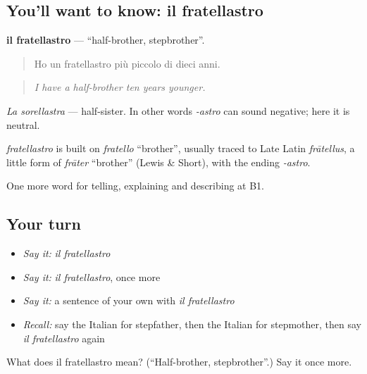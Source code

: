 \subsection*{You'll want to know: il fratellastro}
\textbf{il fratellastro} — \textquotedblleft{}half-brother, stepbrother\textquotedblright{}.

\begin{quote}
Ho un fratellastro più piccolo di dieci anni.
\end{quote}

\begin{quote}
\emph{I have a half-brother ten years younger.}
\end{quote}

\emph{La sorellastra} — half-sister. In other words \emph{-astro} can sound negative; here it is neutral.

\begin{cousinweb}
\emph{fratellastro} is built on \emph{fratello} \textquotedblleft{}brother\textquotedblright{}, usually traced to Late Latin \emph{frātellus}, a little form of \emph{frāter} \textquotedblleft{}brother\textquotedblright{} (Lewis \& Short), with the ending \emph{-astro}.
\end{cousinweb}

\begin{grammarlens}[title={What you've built}]
One more word for telling, explaining and describing at B1.
\end{grammarlens}

\subsection*{Your turn}
\begin{itemize}
\raggedright
  \item \emph{Say it:} \emph{il fratellastro}
  \item \emph{Say it:} \emph{il fratellastro}, once more
  \item \emph{Say it:} a sentence of your own with \emph{il fratellastro}
  \item \emph{Recall:} say the Italian for stepfather, then the Italian for stepmother, then say \emph{il fratellastro} again
\end{itemize}

\begin{tcolorbox}[breakable,colback=teal!4,colframe=teal!35!black,title={Before you move on}]
What does il fratellastro mean? (\textquotedblleft{}Half-brother, stepbrother\textquotedblright{}.) Say it once more.
\end{tcolorbox}
